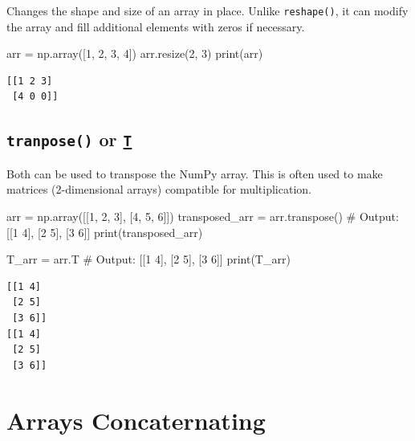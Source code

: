 \documentclass[
  letterpaper,
  DIV=11,
  numbers=noendperiod]{scrreprt}
\newenvironment{Shaded}{\begin{snugshade}}{\end{snugshade}}
\newcommand{\BuiltInTok}[1]{\textcolor[rgb]{0.00,0.23,0.31}{#1}}
\newcommand{\CommentTok}[1]{\textcolor[rgb]{0.37,0.37,0.37}{#1}}
\newcommand{\DecValTok}[1]{\textcolor[rgb]{0.68,0.00,0.00}{#1}}
\newcommand{\NormalTok}[1]{\textcolor[rgb]{0.00,0.23,0.31}{#1}}
\newcommand{\OperatorTok}[1]{\textcolor[rgb]{0.37,0.37,0.37}{#1}}
\begin{document}
Changes the shape and size of an array in place. Unlike
\texttt{reshape()}, it can modify the array and fill additional elements
with zeros if necessary.

\begin{Shaded}
\begin{Highlighting}[]
\NormalTok{arr }\OperatorTok{=}\NormalTok{ np.array([}\DecValTok{1}\NormalTok{, }\DecValTok{2}\NormalTok{, }\DecValTok{3}\NormalTok{, }\DecValTok{4}\NormalTok{])}
\NormalTok{arr.resize(}\DecValTok{2}\NormalTok{, }\DecValTok{3}\NormalTok{) }
\BuiltInTok{print}\NormalTok{(arr)}
\end{Highlighting}
\end{Shaded}

\begin{verbatim}
[[1 2 3]
 [4 0 0]]
\end{verbatim}

\hypertarget{tranpose-or-t}{%
\subsection{\texorpdfstring{\texttt{tranpose()} or
\href{https://numpy.org/doc/stable/reference/generated/numpy.ndarray.T.html}{\texttt{T}}}{tranpose() or T}}\label{tranpose-or-t}}

Both can be used to transpose the NumPy array. This is often used to
make matrices (2-dimensional arrays) compatible for multiplication.

\begin{Shaded}
\begin{Highlighting}[]
\NormalTok{arr }\OperatorTok{=}\NormalTok{ np.array([[}\DecValTok{1}\NormalTok{, }\DecValTok{2}\NormalTok{, }\DecValTok{3}\NormalTok{], [}\DecValTok{4}\NormalTok{, }\DecValTok{5}\NormalTok{, }\DecValTok{6}\NormalTok{]])}
\NormalTok{transposed\_arr }\OperatorTok{=}\NormalTok{ arr.transpose()  }\CommentTok{\# Output: [[1 4], [2 5], [3 6]]}
\BuiltInTok{print}\NormalTok{(transposed\_arr)}

\NormalTok{T\_arr }\OperatorTok{=}\NormalTok{ arr.T  }\CommentTok{\# Output: [[1 4], [2 5], [3 6]]}
\BuiltInTok{print}\NormalTok{(T\_arr)}
\end{Highlighting}
\end{Shaded}

\begin{verbatim}
[[1 4]
 [2 5]
 [3 6]]
[[1 4]
 [2 5]
 [3 6]]
\end{verbatim}

\hypertarget{arrays-concaternating}{%
\section{Arrays Concaternating}\label{arrays-concaternating}}
\end{document}
